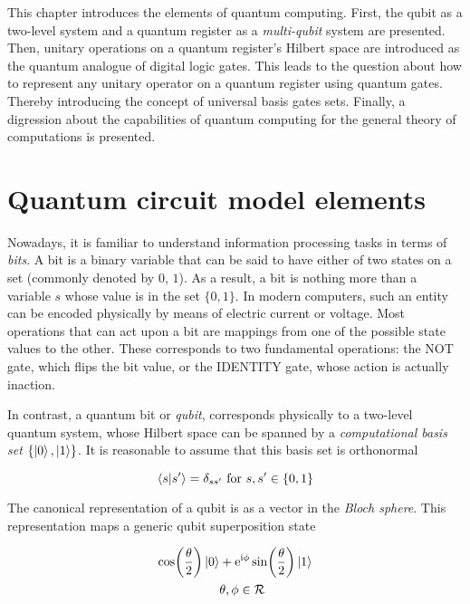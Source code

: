 This chapter introduces the elements of quantum computing. First, the qubit as a two-level system and a quantum register as a \textit{multi-qubit} system are presented. Then, unitary operations on a quantum register's Hilbert space are introduced as the quantum analogue of digital logic gates. This leads to the question about how to represent any unitary operator on a quantum register using quantum gates. Thereby introducing the concept of universal basis gates sets. Finally, a digression about the capabilities of quantum computing for the general theory of computations is presented.

\section{Quantum circuit model elements}

  Nowadays, it is familiar to understand information processing tasks in terms of \textit{bits}. A bit is a binary variable that can be said to have either of two states on a set (commonly denoted by $0$, $1$). As a result, a bit is nothing more than a variable $s$ whose value is in the set $\{0,1\}$. In modern computers, such an entity can be encoded physically by means of electric current or voltage. Most operations that can act upon a bit are mappings from one of the possible state values to the other. These corresponds to two fundamental operations: the NOT gate, which flips the bit value, or the IDENTITY gate, whose action is actually inaction.

  In contrast, a quantum bit or \textit{qubit}, corresponds physically to a two-level quantum system, whose Hilbert space can be spanned by a \textit{computational basis set} $\{\ket{0}, \ket{1}\}$. It is reasonable to assume that this basis set is orthonormal

  \begin{equation}
    \braket{s}{s'} = \delta_{ss'} \text{ for } s, s' \in \{0,1\}
    \label{eq:comp-basis}
  \end{equation}

  The canonical representation of a qubit is as a vector in the \textit{Bloch sphere}. This representation maps a generic qubit superposition state

  \begin{align}
    \cos(\frac{\theta}{2}) \ket{0} &  + \mathrm{e}^{\mathrm{i}\phi}\sin(\frac{\theta}{2})\ket{1} \\
    & \theta, \phi \in \mathcal{R}
    \label{eq:qubit-state}
  \end{align}

